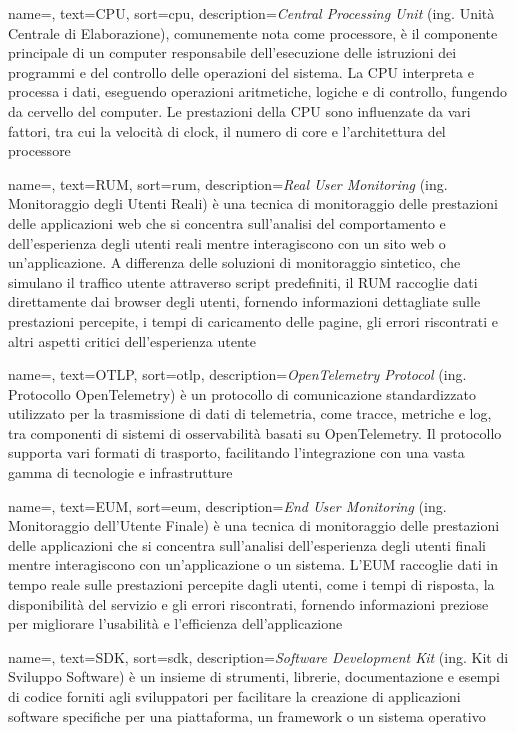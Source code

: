  {
    name=,
    text=CPU,
    sort=cpu,
    description={\emph{Central Processing Unit} (ing. Unità Centrale di Elaborazione), comunemente nota come processore, è il componente principale di un computer responsabile dell'esecuzione delle istruzioni dei programmi e del controllo delle operazioni del sistema. La CPU interpreta e processa i dati, eseguendo operazioni aritmetiche, logiche e di controllo, fungendo da cervello del computer. Le prestazioni della CPU sono influenzate da vari fattori, tra cui la velocità di clock, il numero di core e l'architettura del processore}
}

 {
    name=,
    text=RUM,
    sort=rum,
    description={\emph{Real User Monitoring} (ing. Monitoraggio degli Utenti Reali) è una tecnica di monitoraggio delle prestazioni delle applicazioni web che si concentra sull'analisi del comportamento e dell'esperienza degli utenti reali mentre interagiscono con un sito web o un'applicazione. A differenza delle soluzioni di monitoraggio sintetico, che simulano il traffico utente attraverso script predefiniti, il RUM raccoglie dati direttamente dai browser degli utenti, fornendo informazioni dettagliate sulle prestazioni percepite, i tempi di caricamento delle pagine, gli errori riscontrati e altri aspetti critici dell'esperienza utente}
}

 {
    name=,
    text=OTLP,
    sort=otlp,
    description={\emph{OpenTelemetry Protocol} (ing. Protocollo OpenTelemetry) è un protocollo di comunicazione standardizzato utilizzato per la trasmissione di dati di telemetria, come tracce, metriche e log, tra componenti di sistemi di osservabilità basati su OpenTelemetry. Il protocollo supporta vari formati di trasporto, facilitando l'integrazione con una vasta gamma di tecnologie e infrastrutture}
}

 {
    name=,
    text=EUM,
    sort=eum,
    description={\emph{End User Monitoring} (ing. Monitoraggio dell'Utente Finale) è una tecnica di monitoraggio delle prestazioni delle applicazioni che si concentra sull'analisi dell'esperienza degli utenti finali mentre interagiscono con un'applicazione o un sistema. L'EUM raccoglie dati in tempo reale sulle prestazioni percepite dagli utenti, come i tempi di risposta, la disponibilità del servizio e gli errori riscontrati, fornendo informazioni preziose per migliorare l'usabilità e l'efficienza dell'applicazione}
}

 {
    name=,
    text=SDK,
    sort=sdk,
    description={\emph{Software Development Kit} (ing. Kit di Sviluppo Software) è un insieme di strumenti, librerie, documentazione e esempi di codice forniti agli sviluppatori per facilitare la creazione di applicazioni software specifiche per una piattaforma, un framework o un sistema operativo}
}
